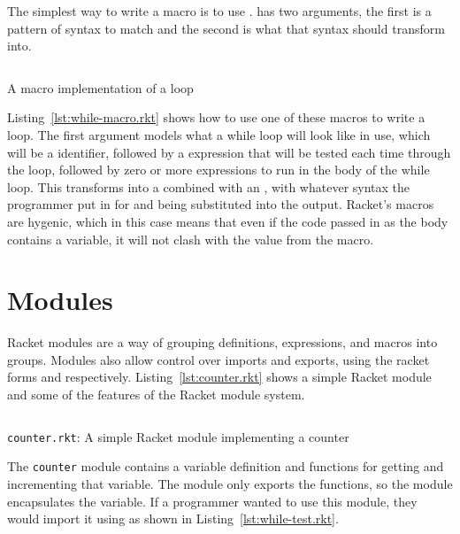 The simplest way to write a macro is to use .
 has two arguments, the first is a pattern of syntax to match and the second is what that syntax should transform into.
\begin{listing}
  \inputminted{racket}{listings/while-macro.rkt}
  \caption{A macro implementation of a  loop}
  \label{lst:while-macro.rkt}
\end{listing}
Listing~\ref{lst:while-macro.rkt} shows how to use one of these macros to write a  loop. 
The first argument models what a while loop will look like in use, which will be a  identifier, followed by a  expression that will be tested each time through the loop, followed by zero or more expressions to run in the body of the while loop.
This transforms into a  combined with an , with whatever syntax the programmer put in for  and  being substituted into the output.
Racket's macros are hygenic, which in this case means that even if the code passed in as the body contains a  variable, it will not clash with the value from the macro.

\section{Modules}
Racket modules are a way of grouping definitions, expressions, and macros into groups. 
Modules also allow control over imports and exports, using the racket forms  and  respectively.
Listing~\ref{lst:counter.rkt} shows a simple Racket module and some of the features of the Racket module system.
\begin{listing}
  \inputminted{racket}{listings/counter.rkt}
  \caption{\texttt{counter.rkt}: A simple Racket module implementing a counter}
  \label{lst:counter.rkt}
\end{listing}
The \texttt{counter} module contains a variable definition and functions for getting and incrementing that variable.
The module only exports the functions, so the module encapsulates the variable.
If a programmer wanted to use this module, they would import it using  as shown in Listing~\ref{lst:while-test.rkt}. 

